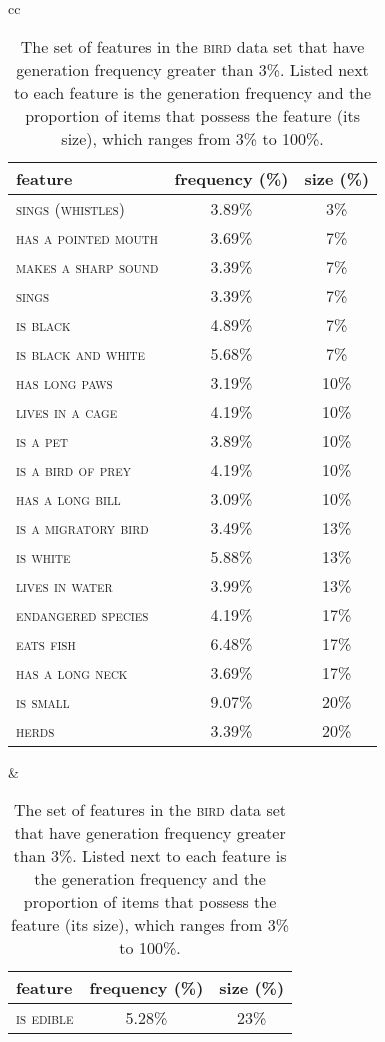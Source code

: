 \documentclass{apa}
\newcommand{\feature}[1]{\textsc{#1}}
\newcommand{\domain}[1]{\textsc{#1}}
\begin{document}
\begin{table}
\begin{center}
\caption{The set of features in the \domain{bird} data set that have generation frequency greater than 3\%. Listed next to each feature is the generation frequency and the proportion of items that possess the feature (its size), which ranges from 3\% to 100\%. \vspace*{4pt}}
\label{featuresinc}
\footnotesize
\begin{tabular}{cc}
\begin{tabular}{lcc} \hline
feature & frequency (\%) & size (\%) \\ \hline
\feature{sings (whistles)	} & 		3.89\% & 3\% \\
\feature{has a pointed mouth} &  	3.69\% & 7\% \\
\feature{makes a sharp sound}	&   3.39\% & 7\% \\
\feature{sings}	  &  			3.39\% & 7\% \\
\feature{is black}   & 			4.89\% & 7\% \\
\feature{is black and white}	&   5.68\% &  7\% \\
\feature{has long paws}	&    	3.19\% & 10\% \\
\feature{lives in a cage}	&    	4.19\% & 10\% \\
\feature{is a pet	}  &  			3.89\% & 10\% \\
\feature{is a bird of prey}	&   4.19\% & 10\% \\
\feature{has a long bill}	 &   	3.09\% & 10\% \\
\feature{is a migratory bird}	 &  3.49\% & 13\% \\
\feature{is white	}  &  			5.88\% & 13\% \\
\feature{lives in water}	 &   	3.99\% &  13\% \\
\feature{endangered species}	&   4.19\% & 17\% \\
\feature{eats fish}	 &   		6.48\% & 17\% \\
\feature{has a long neck}	 &   	3.69\% & 17\% \\
\feature{is small} &   			9.07\% & 20\% \\
\feature{herds}	  &  			3.39\% & 20\% \\
\hline
\end{tabular}
&
\begin{tabular}{lcc} \hline
feature & frequency (\%) & size (\%) \\ \hline
\feature{is edible}	&    		5.28\% & 23\% \\

\end{tabular}
\end{tabular}
\end{center}
\end{table}
\end{document}
